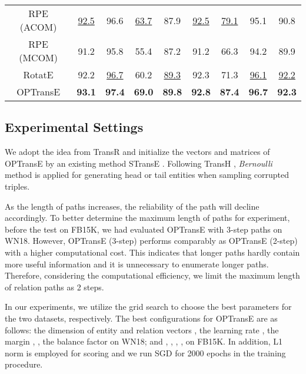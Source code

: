 \documentclass[11pt,a4paper]{article}
\begin{document}
\begin{table*}[]
\begin{tabular}{|c|cccc|cccc|}
RPE (ACOM)         & \underline{92.5}         & 96.6        & \underline{63.7}        & 87.9        & \underline{92.5}         & \underline{79.1}        & 95.1        & 90.8       \\
RPE (MCOM)           & 91.2         & 95.8             & 55.4         & 87.2             & 91.2         & 66.3             & 94.2         & 89.9             \\
RotatE          & 92.2         & \underline{96.7}             & 60.2         & \underline{89.3}             & 92.3         & 71.3             & \underline{96.1}         & \underline{92.2}             \\
\hline
OPTransE          & \bf93.1         & \bf97.4        & \bf69.0        & \bf89.8        & \bf92.8         & \bf87.4        & \bf96.7        & \bf{92.3}       \\
\hline
\end{tabular}
\end{table*}





\subsection{Experimental Settings}

We adopt the idea from TransR \cite{lin2015learning} and initialize
the vectors and matrices of OPTransE by an existing method STransE
\cite{nguyen2016stranse}. Following TransH \cite{wang2014knowledge},
\emph{Bernoulli} method is applied for generating head or tail
entities when sampling corrupted triples.

As the length of paths increases, the reliability of the path will
decline accordingly. To better determine the maximum length of paths
for experiment, before the test on FB15K, we had evaluated OPTransE
with 3-step paths on WN18. However, OPTransE (3-step) performs
comparably as OPTransE (2-step) with a higher computational cost.
This indicates that longer paths hardly contain more useful information
and it is unnecessary to enumerate longer paths. Therefore,
considering the computational efficiency, we limit the maximum
length of relation paths as 2 steps.

In our experiments, we utilize the grid search to choose the best
parameters for the two datasets, respectively. The best configurations for OPTransE are as follows: the dimension
of entity and relation vectors , the
learning rate , the margin , , the balance factor  on WN18; and , , , ,  on FB15K. In addition, L1 norm is
employed for scoring and we run SGD for 2000 epochs in the training
procedure.
\end{document}
